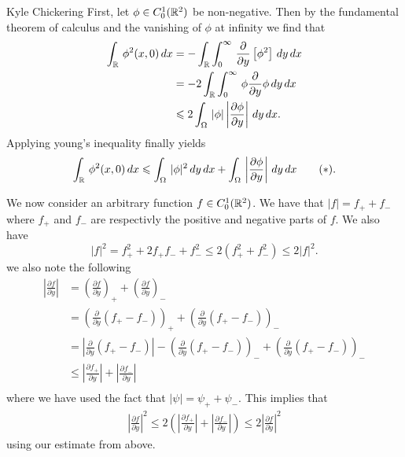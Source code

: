 

\begin{solution}{Kyle Chickering}
	First, let $\phi\in C_0^1(\mathbb{R}^2)$ be non-negative.
    Then by the fundamental theorem of calculus and the vanishing of $\phi$ at infinity we find that
	\begin{align*}
		\int_{\mathbb{R}}\,\phi^2(x,0)\,dx &= -\int_{\mathbb{R}}\int_0^\infty\,\frac{\partial}{\partial y}\left[\phi^2\right]\,dy\,dx \\
                                   &= -2\int_{\mathbb{R}}\int_0^\infty\,\phi\frac{\partial}{\partial y}\phi\,dy\,dx \\
                                   &\leqslant 2\int_{\Omega}\,|\phi|\left|\frac{\partial \phi}{\partial y}\right|\,dy\,dx .
	\end{align*}
	Applying young's inequality finally yields
    \[ \int_{\mathbb{R}}\,\phi^2(x,0)\,dx \leqslant \int_{\Omega}\,|\phi|^2\,dy\,dx + \int_{\Omega}\,\left|\frac{\partial \phi}{\partial y}\right|\,dy\,dx \tag{$*$}. \]

	We now consider an arbitrary function $f\in C_0^1(\mathbb{R}^2)$.
    We have that $|f|=f_++f_-$ where $f_+$ and $f_-$ are respectivly the positive and negative parts of $f$.
    We also have
    \[ |f|^2 = f_+^2 + 2f_+f_- + f_-^2 \leqslant 2(f_+^2 + f_-^2) \leqslant 2|f|^2 \tag{$**$}. \]
	we also note the following
	\begin{align*}
		\left|\frac{\partial f}{\partial y}\right|
		&=
			\left(\frac{\partial f}{\partial y}\right)_+ +
			\left(\frac{\partial f}{\partial y}\right)_- \\
		&=
			\left(\frac{\partial}{\partial y}(f_+-f_-)\right)_+ +
			\left(\frac{\partial}{\partial y}(f_+-f_-)\right)_- \\
		&= \left|\frac{\partial}{\partial y}(f_+-f_-)\right| -
			\left(\frac{\partial}{\partial y}(f_+-f_-)\right)_- +
			\left(\frac{\partial}{\partial y}(f_+-f_-)\right)_- \\
		&\leqslant \left|\frac{\partial f_+}{\partial y}\right| +
			\left|\frac{\partial f_-}{\partial y}\right| \\
	\end{align*}
	where we have used the fact that $|\psi|= \psi_++\psi_-$.
    This implies that
	\begin{align*}
		\left|\frac{\partial f}{\partial y}\right|^2 \leqslant 2\left(\left|\frac{\partial f_+}{\partial y}\right| +
			\left|\frac{\partial f_-}{\partial y}\right|\right) \leqslant
		2\left|\frac{\partial f}{\partial y}\right|^2 \tag{$***$}
	\end{align*}
	using our estimate from above.


\end{solution}
